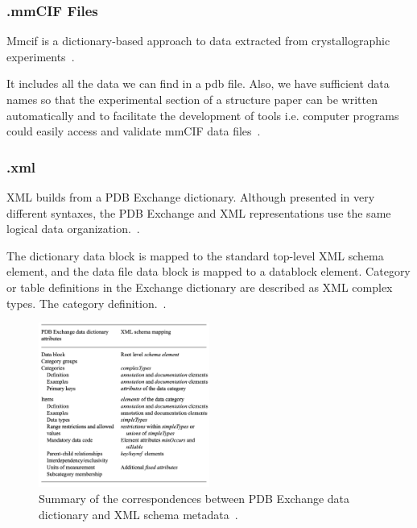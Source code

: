 \documentclass[]{final_report}
\begin{document}
\clearpage

\subsubsection{.mmCIF Files}
Mmcif is a dictionary-based approach to data extracted from crystallographic experiments~\cite{westbrook_pdb_2003}.

It includes all the data we can find in a pdb file. Also, we have sufficient data names so that the experimental section of a structure paper can be written automatically and to facilitate the development of tools i.e. computer programs could easily access and validate mmCIF data files~\cite{westbrook_pdb_2003}.

\subsubsection{.xml}

XML builds from a PDB Exchange dictionary. Although presented in very different syntaxes, the PDB Exchange and XML representations use the same logical data organization.~\cite{westbrook_pdbml_2005}.

The dictionary data block is mapped to the standard top-level XML schema element, and the data file data block is mapped to a datablock element. Category or table definitions in the Exchange dictionary are described as XML complex types. The category definition.~\cite{westbrook_pdbml_2005}.

\vspace{70px}

\begin{figure}[ht]
    \centering
    \includegraphics[width=0.5\textwidth]{xml.png}
    \caption{\label{fig:xml}Summary of the correspondences between PDB Exchange data dictionary and XML schema metadata~\cite{westbrook_pdbml_2005}.}
\end{figure}
\end{document}
